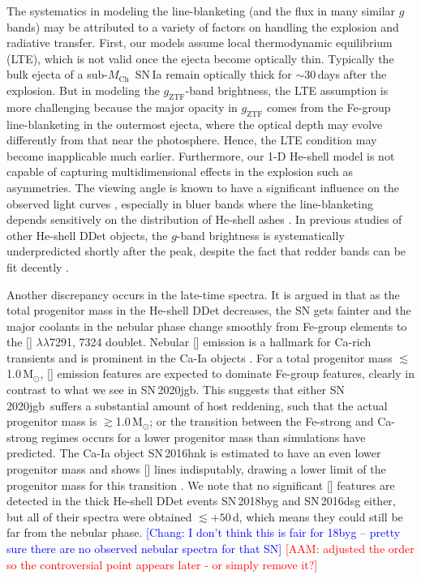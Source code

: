 \documentclass[twocolumn]{aastex631}
\newcommand{\sn}{SN\,2020jgb}
\newcommand{\Mch}{$M_\mathrm{Ch}$}
\newcommand{\Msun}{\mathrm{M_\odot}}
\newcommand{\adam}[1]{\textcolor{red}{[AAM: #1]}}
\newcommand{\chang}[1]{\textcolor{blue}{[Chang: #1]}}
\begin{document}
The systematics in modeling the line-blanketing (and the flux in many similar $g$ bands) may be attributed to a variety of factors on handling the explosion and radiative transfer. First, our models assume local thermodynamic equilibrium (LTE), which is not valid once the ejecta become optically thin. Typically the bulk ejecta of a sub-\Mch\ SN\,Ia remain optically thick for $\sim$30\,days after the explosion. But in modeling the $g_\mathrm{ZTF}$-band brightness, the LTE assumption is more challenging because the major opacity in $g_\mathrm{ZTF}$ comes from the Fe-group line-blanketing in the outermost ejecta, where the optical depth may evolve differently from that near the photosphere. Hence, the LTE condition may become inapplicable much earlier. Furthermore, our 1-D He-shell model is not capable of capturing multidimensional effects in the explosion such as asymmetries. The viewing angle is known to have a significant influence on the observed light curves \citep{Kromer_DD_2010, Sim_2012, Gronow_2020, Shen_2D_2021}, especially in bluer bands where the line-blanketing depends sensitively on the distribution of He-shell ashes \citep{Shen_2D_2021}. In previous studies of other He-shell DDet objects, the $g$-band brightness is systematically underpredicted shortly after the peak, despite the fact that redder bands can be fit decently \citep[e.g.,][]{jiang_16jhr_2017,jacobson-galan_16hnk_2020}.

Another discrepancy occurs in the late-time spectra. It is argued in \citet{polin_nebular_2021} that as the total progenitor mass in the He-shell DDet decreases, the SN gets fainter and the major coolants in the nebular phase change smoothly from Fe-group elements to the [] $\lambda\lambda$7291, 7324 doublet. Nebular [] emission is a hallmark for Ca-rich transients and is prominent in the Ca-Ia objects \citep{galbany_16hnk_2019,De_Ca-rich_2020}. For a total progenitor mass $\lesssim$1.0\,$\Msun$, [] emission features are expected to dominate Fe-group features, clearly in contrast to what we see in \sn. This suggests that either \sn\ suffers a substantial amount of host reddening, such that the actual progenitor mass is $\gtrsim$1.0\,$\Msun$; or the transition between the Fe-strong and Ca-strong regimes occurs for a lower progenitor mass than simulations have predicted.  
The Ca-Ia object SN\,2016hnk is estimated to have an even lower progenitor mass \citep[$\sim$0.87\,$\Msun$;][]{jacobson-galan_16hnk_2020} and shows [] lines indisputably, drawing a lower limit of the progenitor mass for this transition \citep[c.f.,][for discussion on the potential host galaxy extinction on SN\,2016hnk]{galbany_16hnk_2019}. We note that no significant [] features are detected in the thick He-shell DDet events SN\,2018byg and SN\,2016dsg either, but all of their spectra were obtained $\lesssim$$+50$\,d, which means they could still be far from the nebular phase. %
\chang{I don't think this is fair for 18byg -- pretty sure there are no observed nebular spectra for that SN} \adam{adjusted the order so the controversial point appears later - or simply remove it?}
\end{document}
